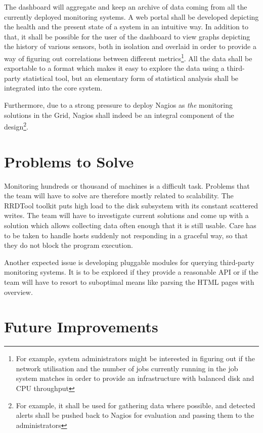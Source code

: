 \documentclass[12pt]{article}
\begin{document}
The dashboard will aggregate and keep an archive of data coming from all the currently deployed monitoring systems.  A web portal
shall be developed depicting the health and the present state of a system in an intuitive way.  In addition to that, it shall be
possible for the user of the dashboard to view graphs depicting the history of various sensors, both in isolation and overlaid in
order to provide a way of figuring out correlations between different metrics\footnote{For example, system administrators might be
interested in figuring out if the network utilisation and the number of jobs currently running in the job system matches in order
to provide an infrastructure with balanced disk and CPU throughput}.  All the data shall be exportable to a format which makes it
easy to explore the data using a third-party statistical tool, but an elementary form of statistical analysis shall be integrated
into the core system.

Furthermore, due to a strong pressure to deploy Nagios as {\em the} monitoring solutions in the Grid, Nagios shall indeed be an
integral component of the design\footnote{For example, it shall be used for gathering data where possible, and detected alerts
shall be pushed back to Nagios for evaluation and passing them to the administrators}.

\section{Problems to Solve}

Monitoring hundreds or thousand of machines is a difficult task.  Problems that the team will have to solve are therefore mostly
related to scalability.  The RRDTool toolkit puts high load to the disk subsystem with its constant scattered writes.  The team
will have to investigate current solutions and come up with a solution which allows collecting data often enough that it is still
usable.  Care has to be taken to handle hosts suddenly not responding in a graceful way, so that they do not block the program
execution.

Another expected issue is developing pluggable modules for querying third-party monitoring systems.  It is to be explored if they
provide a reasonable API or if the team will have to resort to suboptimal means like parsing the HTML pages with overview.

\section{Future Improvements}
\end{document}
